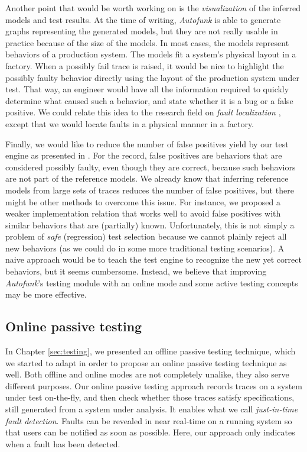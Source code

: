 Another point that would be worth working on is the
\emph{visualization} of the inferred models and test results. At
the time of writing, \emph{Autofunk} is able to generate graphs
representing the generated models, but they are not really usable
in practice because of the size of the models. In most cases, the
models represent behaviors of a production system. The models fit
a system's physical layout in a factory. When a possibly fail
trace is raised, it would be nice to highlight the possibly
faulty behavior directly using the layout of the production
system under test. That way, an engineer would have all the
information required to quickly determine what caused such a
behavior, and state whether it is a bug or a false positive. We
could relate this idea to the research field on \emph{fault
localization} \cite{jones2002visualization,wong2010software},
except that we would locate faults in a physical manner in a
factory.

Finally, we would like to reduce the number of false positives
yield by our test engine as presented in
. For the
record, false positives are behaviors that are considered
possibly faulty, even though they are correct, because such
behaviors are not part of the reference models. We already know
that inferring reference models from large sets of traces reduces
the number of false positives, but there might be other methods
to overcome this issue. For instance, we proposed a weaker
implementation relation that works well to avoid false positives
with similar behaviors that are (partially) known. Unfortunately,
this is not simply a problem of \emph{safe} (regression) test
selection \cite{orso2004scaling} because we cannot plainly reject
all new behaviors (as we could do in some more traditional
testing scenarios). A naive approach would be to teach the test
engine to recognize the new yet correct behaviors, but it seems
cumbersome. Instead, we believe that improving \emph{Autofunk}'s
testing module with an online mode and some active testing
concepts may be more effective.


\subsection{Online passive testing}
\label{sec:conclusion:testing:online}

In Chapter \ref{sec:testing}, we presented an offline passive
testing technique, which we started to adapt in order to propose
an online passive testing technique as well. Both offline and
online modes are not completely unalike, they also serve
different purposes.
Our online passive testing approach records traces on a system
under test on-the-fly, and then check whether those traces
satisfy specifications, still generated from a system under
analysis. It enables what we call \emph{just-in-time fault
detection}. Faults can be revealed in near real-time on a running
system so that users can be notified as soon as possible. Here,
our approach only indicates when a fault has been detected.

